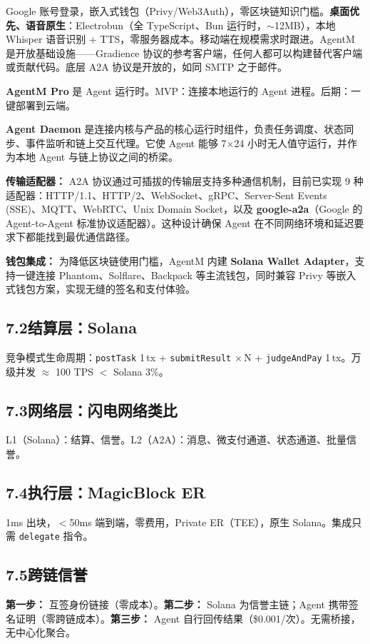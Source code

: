 \documentclass[11pt,a4paper]{article}
\begin{document}
Google 账号登录，嵌入式钱包（Privy/Web3Auth），零区块链知识门槛。\textbf{桌面优先、语音原生}：Electrobun（全 TypeScript、Bun 运行时，$\sim$12MB），本地 Whisper 语音识别 + TTS，零服务器成本。移动端在规模需求时跟进。AgentM 是开放基础设施——Gradience 协议的参考客户端，任何人都可以构建替代客户端或贡献代码。底层 A2A 协议是开放的，如同 SMTP 之于邮件。

\textbf{AgentM Pro} 是 Agent 运行时。MVP：连接本地运行的 Agent 进程。后期：一键部署到云端。

\textbf{Agent Daemon} 是连接内核与产品的核心运行时组件，负责任务调度、状态同步、事件监听和链上交互代理。它使 Agent 能够 7×24 小时无人值守运行，并作为本地 Agent 与链上协议之间的桥梁。

\textbf{传输适配器：} A2A 协议通过可插拔的传输层支持多种通信机制，目前已实现 9 种适配器：HTTP/1.1、HTTP/2、WebSocket、gRPC、Server-Sent Events (SSE)、MQTT、WebRTC、Unix Domain Socket，以及 \textbf{google-a2a}（Google 的 Agent-to-Agent 标准协议适配器）。这种设计确保 Agent 在不同网络环境和延迟要求下都能找到最优通信路径。

\textbf{钱包集成：} 为降低区块链使用门槛，AgentM 内建 \textbf{Solana Wallet Adapter}，支持一键连接 Phantom、Solflare、Backpack 等主流钱包，同时兼容 Privy 等嵌入式钱包方案，实现无缝的签名和支付体验。

\subsection{7.2\quad 结算层：Solana}
竞争模式生命周期：\texttt{postTask} 1\,tx + \texttt{submitResult} $\times$\,N + \texttt{judgeAndPay} 1\,tx。万级并发 $\approx$ 100 TPS $<$ Solana 3\%。

\subsection{7.3\quad 网络层：闪电网络类比}
L1（Solana）：结算、信誉。L2（A2A）：消息、微支付通道、状态通道、批量信誉。

\subsection{7.4\quad 执行层：MagicBlock ER}
1ms 出块，$<$50ms 端到端，零费用，Private ER（TEE），原生 Solana。集成只需 \texttt{delegate} 指令。

\subsection{7.5\quad 跨链信誉}
\textbf{第一步：} 互签身份链接（零成本）。\textbf{第二步：} Solana 为信誉主链；Agent 携带签名证明（零跨链成本）。\textbf{第三步：} Agent 自行回传结果（\$0.001/次）。无需桥接，无中心化聚合。
\end{document}
